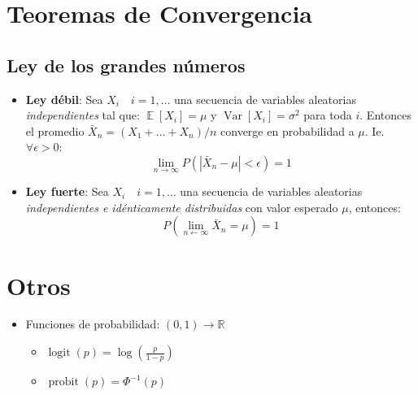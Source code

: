 \documentclass[pdftex,11pt,a4paper]{article}
\DeclareMathOperator{\Var}{Var}
\DeclareMathOperator{\E}{\mathbb{E}}
\DeclareMathOperator{\logit}{logit}
\DeclareMathOperator{\probit}{probit}
\begin{document}
\section{Teoremas de Convergencia}
\subsection{Ley de los grandes números}
\begin{itemize}
	\item \textbf{Ley débil}: Sea ${X_i} \quad i = 1,\ldots$ una secuencia de variables aleatorias \emph{independientes} tal que: $\E[X_i] = \mu$ y $\Var[X_i] = \sigma^2$ para toda $i$. Entonces el promedio $\bar{X}_n = (X_1+\ldots+X_n)/n$ converge en probabilidad a $\mu$. Ie. $\forall\epsilon>0$: $$\lim_{n\rightarrow\infty}P(|\bar{X}_n-\mu|<\epsilon) = 1$$
	\item \textbf{Ley fuerte}: Sea ${X_i} \quad i = 1,\ldots$ una secuencia de variables aleatorias \emph{independientes e idénticamente distribuidas} con valor esperado $\mu$, entonces:
	$$P\left(\lim_{n\leftarrow \infty} \bar{X}_n = \mu\right) = 1$$
\end{itemize}
	
\section{Otros}
\begin{itemize}
	\item Funciones de probabilidad: $(0,1)\rightarrow \mathbb{R}$
	\begin{itemize}
		\item $\logit(p) = \log\left(\frac{p}{1-p}\right)$
		\item $\probit(p) = \Phi^{-1}(p)$
	\end{itemize}
\end{itemize}
\end{document}
